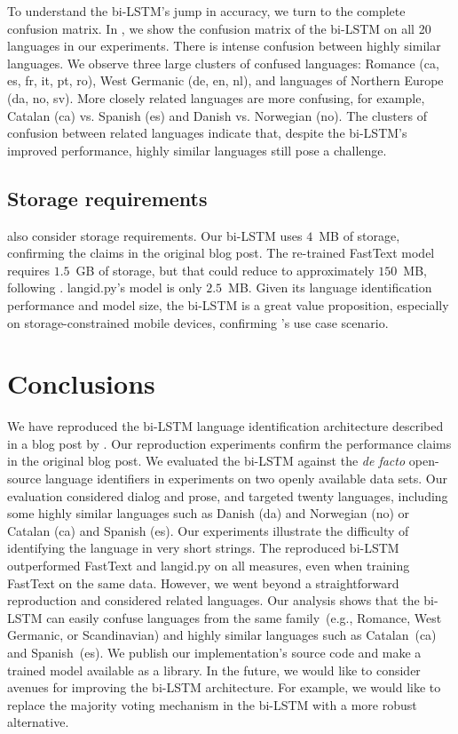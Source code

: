 \documentclass[11pt,a4paper]{article}
\newcommand{\fasttext}{FastText\xspace}
\newcommand{\langidpy}{langid.py\xspace}
\begin{document}
To understand the bi-LSTM's jump in accuracy, we turn to the complete confusion matrix. In , we show the confusion matrix of the bi-LSTM on all 20 languages in our experiments. There is intense confusion between highly similar languages. We observe three large clusters of confused languages: Romance (ca, es, fr, it, pt, ro), West Germanic (de, en, nl), and  languages of Northern Europe (da, no, sv). More closely related languages are more confusing, for example, Catalan (ca) vs. Spanish (es) and Danish vs. Norwegian (no). The clusters of confusion between related languages indicate that, despite the bi-LSTM's improved performance, highly similar languages still pose a challenge.


 \subsection{Storage requirements}
 \citet{apple} also consider storage requirements. Our bi-LSTM uses $4$~MB of storage, confirming the claims in the original blog post. The re-trained \fasttext model requires $1.5$~GB of storage, but that could reduce to approximately $150$~MB, following \citet{joulin2016fasttext}. \langidpy's model is only $2.5$~MB. Given its language identification performance and model size, the bi-LSTM is a great value proposition, especially on storage-constrained mobile devices, confirming \citeauthor{apple}'s use case scenario.


\section{Conclusions}

We have reproduced the bi-LSTM language identification architecture described in a blog post by \citet{apple}. Our reproduction experiments confirm the performance claims in the original blog post. We evaluated the bi-LSTM against the \emph{de facto} open-source language identifiers in experiments on two openly available data sets. Our evaluation considered dialog and prose, and targeted twenty languages, including some highly similar languages such as Danish (da) and Norwegian (no) or Catalan (ca) and Spanish (es). Our experiments illustrate the diﬃculty of identifying the language in very short strings. The reproduced bi-LSTM outperformed \fasttext and \langidpy on all measures, even when training \fasttext on the same data. However, we went beyond a straightforward reproduction and considered related languages. Our analysis shows that the bi-LSTM can easily confuse languages from the same family~(e.g., Romance, West Germanic, or Scandinavian) and highly similar languages such as Catalan~(ca) and Spanish~(es). We publish our implementation's source code and make a trained model available as a library. In the future, we would like to consider avenues for improving the bi-LSTM architecture. For example, we would like to replace the majority voting mechanism in the bi-LSTM with a more robust alternative.




\end{document}
